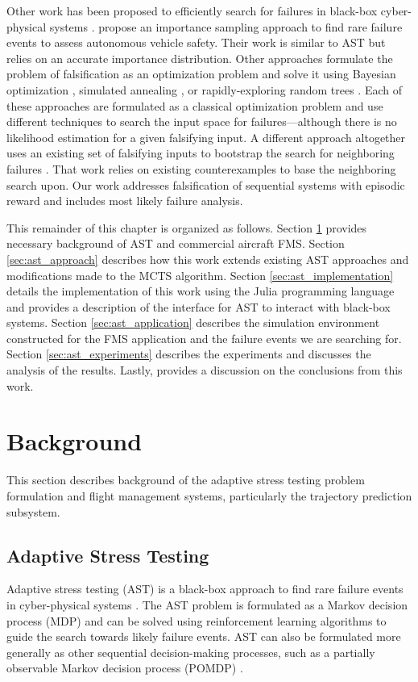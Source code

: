 Other work has been proposed to efficiently search for failures in black-box cyber-physical systems \cite{corso2020survey}.  propose an importance sampling approach to find rare failure events to assess autonomous vehicle safety.
Their work is similar to AST but relies on an accurate importance distribution.
Other approaches formulate the problem of falsification as an optimization problem and solve it using Bayesian optimization \cite{bayes_opt}, simulated annealing \cite{abbas2013probabilistic,aerts2018temporal}, or rapidly-exploring random trees  \cite{rrts}.
Each of these approaches are formulated as a classical optimization problem and use different techniques to search the input space for failures---although there is no likelihood estimation for a given falsifying input.
A different approach altogether uses an existing set of falsifying inputs to bootstrap the search for neighboring failures \cite{diwakaran2017analyzing}.
That work relies on existing counterexamples to base the neighboring search upon.
Our work addresses falsification of sequential systems with episodic reward and includes most likely failure analysis.




This remainder of this chapter is organized as follows. 
Section \ref{sec:ast_background} provides necessary background of AST and commercial aircraft FMS. Section \ref{sec:ast_approach} describes how this work extends existing AST approaches and modifications made to the MCTS algorithm. Section \ref{sec:ast_implementation} details the implementation of this work using the Julia programming language and provides a description of the interface for AST to interact with black-box systems. Section \ref{sec:ast_application} describes the simulation environment constructed for the FMS application and the failure events we are searching for. Section \ref{sec:ast_experiments} describes the experiments and discusses the analysis of the results. Lastly,  provides a discussion on the conclusions from this work.




\section{Background} \label{sec:ast_background}
This section describes background of the adaptive stress testing problem formulation and flight management systems, particularly the trajectory prediction subsystem.

\subsection{Adaptive Stress Testing} \label{sec:ast_background_ast}
Adaptive stress testing (AST) is a black-box approach to find rare failure events in cyber-physical systems \cite{lee2015adaptive,lee2020adaptive}.
The AST problem is formulated as a Markov decision process (MDP) and can be solved using reinforcement learning algorithms to guide the search towards likely failure events.
AST can also be formulated more generally as other sequential decision-making processes, such as a partially observable Markov decision process (POMDP) \cite{lee2015adaptive,koren2018adaptive,ast_traj_plan}.

